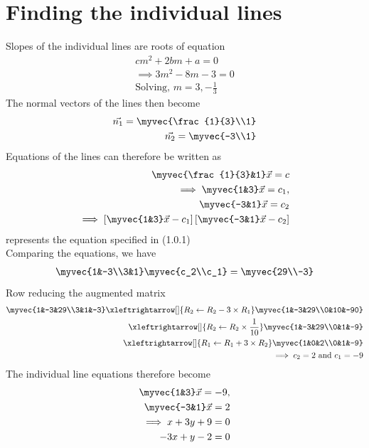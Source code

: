 \section{Finding the individual lines}
Slopes of the individual lines are roots of equation 
\begin{align}
    cm^2+2bm+a=0\\
    \implies 3m^2-8m-3=0\\
    \text{Solving, }m=3,-\frac{1}{3}
\end{align}
The normal vectors of the lines then become
\begin{align}
    \vec{n_1}=\myvec{\frac{1}{3}\\1}\\
    \vec{n_2}=\myvec{-3\\1}
\end{align}
Equations of the lines can therefore be written as
\begin{align}
  \myvec{\frac{1}{3}&1}\vec{x}=c\\
 \implies \myvec{1&3}\vec{x}=c_1 ,\\
   \myvec{-3&1}\vec{x}=c_2\\
  \implies \left[\myvec{1&3}\vec{x}-c_1\right]\left[\myvec{-3&1}\vec{x}-c_2\right]
\end{align}
represents the equation specified in (1.0.1)\\
Comparing the equations, we have
\begin{align}
    \myvec{1&-3\\3&1}\myvec{c_2\\c_1}=\myvec{29\\-3}\\
 \end{align}
 Row reducing the augmented matrix
 \begin{align}
    \myvec{1&-3&29\\3&1&-3}\xleftrightarrow[]{R_2\leftarrow R_2-3\times R_1}
    \myvec{1&-3&29\\0&10&-90}\\
    \xleftrightarrow[]{R_2\leftarrow R_2\times \frac{1}{10}}
    \myvec{1&-3&29\\0&1&-9}\\
    \xleftrightarrow[]{R_1\leftarrow R_1+3\times R_2}
    \myvec{1&0&2\\0&1&-9}\\
    \implies c_2=2 \text{ and }c_1=-9
\end{align}
The individual line equations therefore become
\begin{align}
    \myvec{1&3}\vec{x}=-9 ,\\\myvec{-3&1}\vec{x}=2\\
    \implies 
    x+3y+9=0\\-3x+y-2=0
\end{align}
